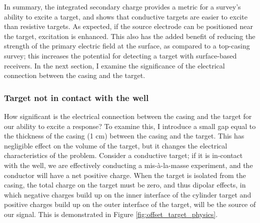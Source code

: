 In summary, the integrated secondary charge provides a metric for a survey's ability to excite a target, and shows that conductive targets are easier to excite than resistive targets. As expected, if the source electrode can be positioned near the target, excitation is enhanced. This also has the added benefit of reducing the strength of the primary electric field at the surface, as compared to a top-casing survey; this  increases the potential for detecting a target with surface-based receivers. In the next section, I examine the significance of the electrical connection between the casing and the target.

\subsubsection{Target not in contact with the well}

How significant is the electrical connection between the casing and the target for our ability to excite a response? To examine this, I introduce a small gap equal to the thickness of the casing (1 cm) between the casing and the target. This has negligible effect on the volume of the target, but it changes the electrical characteristics of the problem. Consider a conductive target; if it is in-contact with the well, we are effectively conducting a mis-\`a-la-masse experiment, and the conductor will have a net positive charge. When the target is isolated from the casing, the total charge on the target must be zero, and thus dipolar effects, in which negative charges build up on the inner interface of the cylinder target and positive charges build up on the outer interface of the target, will be the source of our signal. This is demonstrated in Figure \ref{fig:offset_target_physics}.



